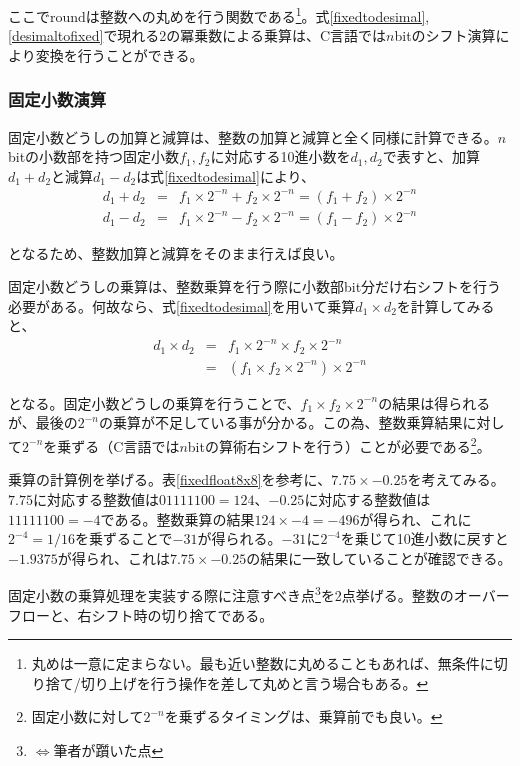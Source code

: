\documentclass[uplatex,dvipdfmx,b5j,10pt]{jsbook}
\theoremstyle{definition}
\begin{document}
ここで$\textrm{round}$は整数への丸めを行う関数である\footnote{丸めは一意に定まらない。最も近い整数に丸めることもあれば、無条件に切り捨て/切り上げを行う操作を差して丸めと言う場合もある。}。式\ref{fixedtodesimal}, \ref{desimaltofixed}で現れる2の冪乗数による乗算は、C言語では$n$bitのシフト演算により変換を行うことができる。

\subsubsection{固定小数演算}

固定小数どうしの加算と減算は、整数の加算と減算と全く同様に計算できる。$n$bitの小数部を持つ固定小数$f_{1}, f_{2}$に対応する10進小数を$d_{1}, d_{2}$で表すと、加算$d_{1} + d_{2}$と減算$d_{1} - d_{2}$は式\ref{fixedtodesimal}により、
\begin{eqnarray*}
  d_{1} + d_{2} &=& f_{1} \times 2^{-n} + f_{2} \times 2^{-n} = (f_{1} + f_{2}) \times 2^{-n} \\
  d_{1} - d_{2} &=& f_{1} \times 2^{-n} - f_{2} \times 2^{-n} = (f_{1} - f_{2}) \times 2^{-n}
\end{eqnarray*}

となるため、整数加算と減算をそのまま行えば良い。

固定小数どうしの乗算は、整数乗算を行う際に小数部bit分だけ右シフトを行う必要がある。何故なら、式\ref{fixedtodesimal}を用いて乗算$d_{1} \times d_{2}$を計算してみると、
\begin{eqnarray*}
  d_{1} \times d_{2} &=& f_{1} \times 2^{-n} \times f_{2} \times 2^{-n} \\
  &=& (f_{1} \times f_{2} \times 2^{-n}) \times 2^{-n}
\end{eqnarray*}

となる。固定小数どうしの乗算を行うことで、$f_{1} \times f_{2} \times 2^{-n}$の結果は得られるが、最後の$2^{-n}$の乗算が不足している事が分かる。この為、整数乗算結果に対して$2^{-n}$を乗ずる（C言語では$n$bitの算術右シフトを行う）ことが必要である\footnote{固定小数に対して$2^{-n}$を乗ずるタイミングは、乗算前でも良い。}。

乗算の計算例を挙げる。表\ref{fixedfloat8x8}を参考に、$7.75 \times -0.25$を考えてみる。$7.75$に対応する整数値は$01111100 = 124$、$-0.25$に対応する整数値は$11111100 = -4$である。整数乗算の結果$124 \times -4 = -496$が得られ、これに$2^{-4}=1/16$を乗ずることで$-31$が得られる。$-31$に$2^{-4}$を乗じて10進小数に戻すと$-1.9375$が得られ、これは$7.75 \times -0.25$の結果に一致していることが確認できる。

固定小数の乗算処理を実装する際に注意すべき点\footnote{$\iff$筆者が躓いた点}を2点挙げる。整数のオーバーフローと、右シフト時の切り捨てである。
\end{document}
